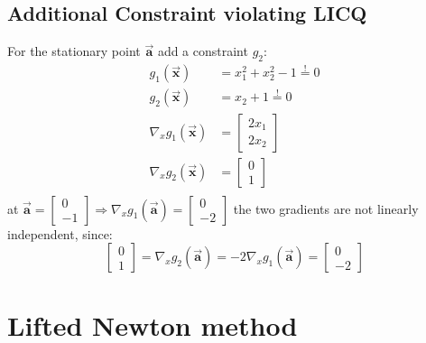 \documentclass[oneside, a4paper]{book}
\newcommand\vek[1]{\vec{\bm{#1}}}
\newcommand\br[1]{\left(#1\right)}
\begin{document}
\section{Additional Constraint violating LICQ}
For the stationary point $\vek{a}$ add a constraint $g_2$:
\begin{align*}
  g_1\br{\vek{x}} &= x_1^2 + x_2^2 - 1 \overset{!}{=} 0\\
  g_2\br{\vek{x}} &= x_2 + 1 \overset{!}{=} 0\\
  \nabla_xg_1(\vek{x}) &= \begin{bmatrix}2x_1\\2x_2\end{bmatrix}\\
  \nabla_xg_2(\vek{x}) &= \begin{bmatrix}0\\1\end{bmatrix} \\
\end{align*}
at $\vek{a}=\begin{bmatrix}0\\-1\end{bmatrix}\Longrightarrow \nabla_xg_1(\vek{a})=\begin{bmatrix}0\\-2\end{bmatrix}$ the two gradients are not linearly independent, since: \[\begin{bmatrix}0\\1\end{bmatrix} = \nabla_xg_2(\vek{a}) = -2 \nabla_xg_1(\vek{a})= \begin{bmatrix}0\\-2\end{bmatrix}\]

\chapter{Lifted Newton method}
\end{document}
